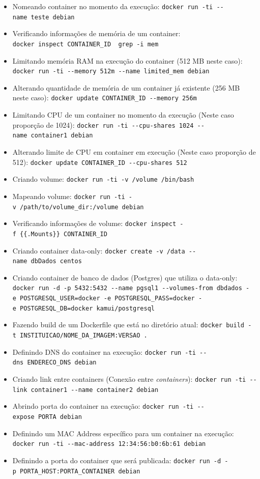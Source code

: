 \documentclass[]{article}
\begin{document}
\begin{itemize}
\item
  Nomeando container no momento da execução: \texttt{docker\ run\ -ti\ -\/-name\ teste\ debian}
\item
  Verificando informações de memória de um container: \texttt{docker\ inspect\ CONTAINER\_ID\ \textbar{}\ grep\ -i\ mem}
\item
  Limitando memória RAM na execução do container (512 MB neste caso): \texttt{docker\ run\ -ti\ -\/-memory\ 512m\ -\/-name\ limited\_mem\ debian}
\item
  Alterando quantidade de memória de um container já existente (256 MB neste caso): \texttt{docker\ update\ CONTAINER\_ID\ -\/-memory\ 256m}
\item
  Limitando CPU de um container no momento da execução (Neste caso proporção de 1024): \texttt{docker\ run\ -ti\ -\/-cpu-shares\ 1024\ -\/-name\ container1\ debian}
\item
  Alterando limite de CPU em container em execução (Neste caso proporção de 512): \texttt{docker\ update\ CONTAINER\_ID\ -\/-cpu-shares\ 512}
\item
  Criando volume: \texttt{docker\ run\ -ti\ -v\ /volume\ /bin/bash}
\item
  Mapeando volume: \texttt{docker\ run\ -ti\ -v\ /path/to/volume\_dir:/volume\ debian}
\item
  Verificando informações de volume: \texttt{docker\ inspect\ -f\ \{\{.Mounts\}\}\ CONTAINER\_ID}
\item
  Criando container data-only: \texttt{docker\ create\ -v\ /data\ -\/-name\ dbDados\ centos}
\item
  Criando container de banco de dados (Postgres) que utiliza o data-only: \texttt{docker\ run\ -d\ -p\ 5432:5432\ -\/-name\ pgsql1\ -\/-volumes-from\ dbdados\ -e\ POSTGRESQL\_USER=docker\ -e\ POSTGRESQL\_PASS=docker\ -e\ POSTGRESQL\_DB=docker\ kamui/postgresql}
\item
  Fazendo build de um Dockerfile que está no diretório atual: \texttt{docker\ build\ -t\ INSTITUICAO/NOME\_DA\_IMAGEM:VERSAO\ .}
\item
  Definindo DNS do container na execução: \texttt{docker\ run\ -ti\ -\/-dns\ ENDERECO\_DNS\ debian}
\item
  Criando link entre containers (Conexão entre \emph{containers}): \texttt{docker\ run\ -ti\ -\/-link\ container1\ -\/-name\ container2\ debian}
\item
  Abrindo porta do container na execução: \texttt{docker\ run\ -ti\ -\/-expose\ PORTA\ debian}
\item
  Definindo um MAC Address específico para um container na execução: \texttt{docker\ run\ -ti\ -\/-mac-address\ 12:34:56:b0:6b:61\ debian}
\item
  Definindo a porta do container que será publicada: \texttt{docker\ run\ -d\ -p\ PORTA\_HOST:PORTA\_CONTAINER\ debian}
\end{itemize}
\end{document}
